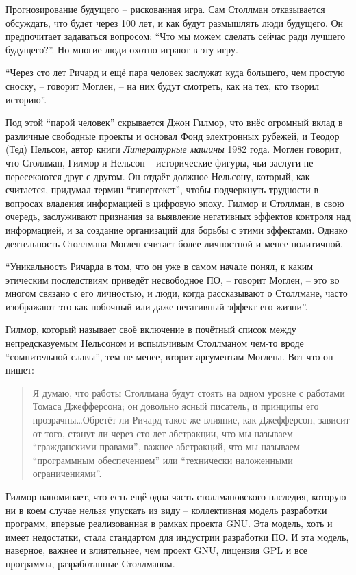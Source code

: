 Прогнозирование будущего -- рискованная игра. Сам Столлман отказывается обсуждать, что будет через 100 лет, и как будут размышлять люди будущего. Он предпочитает задаваться вопросом: \enquote{Что мы можем сделать сейчас ради лучшего будущего?}. Но многие люди охотно играют в эту игру.

\enquote{Через сто лет Ричард и ещё пара человек заслужат куда большего, чем простую сноску, -- говорит Моглен, -- на них будут смотреть, как на тех, кто творил историю}.

Под этой \enquote{парой человек} скрывается Джон Гилмор, что внёс огромный вклад в различные свободные проекты и основал Фонд электронных рубежей, и Теодор (Тед) Нельсон, автор книги \textit{Литературные машины} 1982 года. Моглен говорит, что Столлман, Гилмор и Нельсон -- исторические фигуры, чьи заслуги не пересекаются друг с другом. Он отдаёт должное Нельсону, который, как считается, придумал термин \enquote{гипертекст}, чтобы подчеркнуть трудности в вопросах владения информацией в цифровую эпоху. Гилмор и Столлман, в свою очередь, заслуживают признания за выявление негативных эффектов контроля над информацией, и за создание организаций для борьбы с этими эффектами. Однако деятельность Столлмана Моглен считает более личностной и менее политичной.

\enquote{Уникальность Ричарда в том, что он уже в самом начале понял, к каким этическим последствиям приведёт несвободное ПО, -- говорит Моглен, -- это во многом связано с его личностью, и люди, когда рассказывают о Столлмане, часто изображают это как побочный или даже негативный эффект его жизни}.

Гилмор, который называет своё включение в почётный список между непредсказуемым Нельсоном и вспыльчивым Столлманом чем-то вроде \enquote{сомнительной славы}, тем не менее, вторит аргументам Моглена. Вот что он пишет:

\begin{quote}
Я думаю, что работы Столлмана будут стоять на одном уровне с работами Томаса Джефферсона; он довольно ясный писатель, и принципы его прозрачны\ldots Обретёт ли Ричард такое же влияние, как Джефферсон, зависит от того, станут ли через сто лет абстракции, что мы называем \enquote{гражданскими правами}, важнее абстракций, что мы называем \enquote{программным обеспечением} или \enquote{технически наложенными ограничениями}.
\end{quote}

Гилмор напоминает, что есть ещё одна часть столлмановского наследия, которую ни в коем случае нельзя упускать из виду -- коллективная модель разработки программ, впервые реализованная в рамках проекта GNU. Эта модель, хоть и имеет недостатки, стала стандартом для индустрии разработки ПО. И эта модель, наверное, важнее и влиятельнее, чем проект GNU, лицензия GPL и все программы, разработанные Столлманом.

